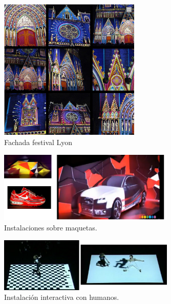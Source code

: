 \begin{figure}[H]
  \centering
    \includegraphics[width=0.6\textwidth]{./Cap1_intro/Fachada1.png}
  \caption[http://www.weltlighting.com/]{Fachada festival Lyon}
  \label{fig:Fachada1}
\end{figure}

\begin{figure}[H]
  \centering
    \includegraphics[width=0.75\textwidth]{./Cap1_intro/instalacion3.png}
  \caption[http:\/\/www.youtube.com\/watch?v=1u3p0JEDzcQ\&feature=related ,http:\/\/www.youtube.com\/watch?v=0Lh4OaaYu9E\&feature=related, http:\/\/www.weltlighting.com\/fragment\/]{Instalaciones sobre maquetas.}
  
  \label{fig:Instalacion}
\end{figure}

\begin{figure}[H]
  \centering
    \includegraphics[width=0.75\textwidth]{./Cap1_intro/instalacionHumano1.png}
  \caption[http://vimeo.com/2774865]{Instalación interactiva con humanos.}
  \label{fig:Interactiva}
\end{figure}


